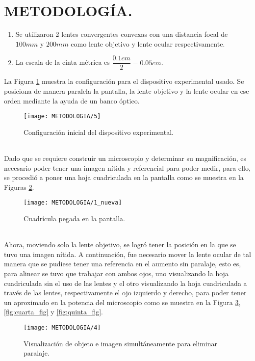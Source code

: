 \documentclass[10pt,a4paper]{article}
\begin{document}
\section{METODOLOGÍA.} %
\begin{enumerate}
	\item Se utilizaron 2 lentes convergentes convexas con una distancia focal de $100mm$ y $200mm$ como lente objetivo y lente ocular respectivamente.
	\item La escala de la cinta métrica es $\dfrac{0.1cm}{2}=0.05cm$.
\end{enumerate}
La Figura \ref{fig:primer_fig} muestra la configuración para el dispositivo experimental usado. Se posiciona de manera paralela la pantalla, la lente objetivo y la lente ocular en ese orden mediante la ayuda de un banco óptico. \\[2mm]
\begin{figure}[ht]
	\centering
	\texttt{[image: METODOLOGIA/5]}
	\caption{Configuración inicial del dispositivo experimental.}
	\label{fig:primer_fig}
\end{figure}\\
Dado que se requiere construir un microscopio y determinar su magnificación, es necesario poder tener una imagen nítida y referencial para poder medir, para ello, se procedió a poner una hoja cuadriculada en la pantalla como se muestra en la Figuras \ref{fig:segunda_fig}. \\[2mm]
\begin{figure}[ht]
	\centering
	\texttt{[image: METODOLOGIA/1\_nueva]}
	\caption{Cuadrícula pegada en la pantalla.}
	\label{fig:segunda_fig}
\end{figure}\\
Ahora, moviendo solo la lente objetivo, se logró tener la posición en la que se tuvo una imagen nítida. A continuación, fue necesario mover la lente ocular de tal manera que se pudiese tener una referencia en el aumento sin paralaje, esto es, para alinear se tuvo que trabajar con ambos ojos, uno visualizando la hoja cuadriculada sin el uso de las lentes y el otro visualizando la hoja cuadriculada a través de las lentes, respectivamente el ojo izquierdo y derecho, para poder tener un aproximado en la potencia del microscopio como se muestra en la Figura \ref{fig:tercer_fig}, \ref{fig:cuarta_fig} y \ref{fig:quinta_fig}. \\[2mm]
\begin{figure}[ht]
	\centering
	\texttt{[image: METODOLOGIA/4]}
	\caption{Visualización de objeto e imagen simultáneamente para eliminar paralaje.}
	\label{fig:tercer_fig}
\end{figure}\\
\end{document}

